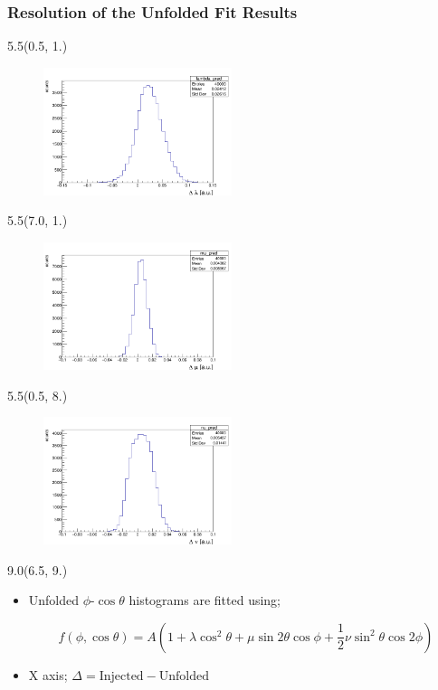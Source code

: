 \documentclass[12pt, xcolor={dvipsnames}, aspectratio = 169, sans, mathserif]{beamer}
\newenvironment{List}[2]
{\begin{textblock}{#1}#2
\begin{itemize}}
{\end{itemize}
\end{textblock}}
\newenvironment{Pic}[2]
{\begin{textblock}{#1}#2
\begin{figure}}
{\end{figure}
\end{textblock}}
\begin{document}
\begin{frame}
\frametitle{Resolution of the Unfolded Fit Results}

\begin{Pic}{5.5}{(0.5, 1.)}
  \includegraphics[width=5.5cm]{imgs/lambda_pred.png}
\end{Pic}

\begin{Pic}{5.5}{(7.0, 1.)}
  \includegraphics[width=5.5cm]{imgs/mu_pred.png}
\end{Pic}

\begin{Pic}{5.5}{(0.5, 8.)}
  \includegraphics[width=5.5cm]{imgs/nu_pred.png}
\end{Pic}

\begin{List}{9.0}{(6.5, 9.)}

  \item Unfolded $\phi$-$\cos\theta$ histograms are fitted using;

\begin{scriptsize}
\begin{equation}
\label{eq:1}
f(\phi, \cos\theta) = A(1  + \lambda \cos^{2}\theta + \mu \sin 2 \theta \cos \phi + \dfrac{1}{2}\nu \sin^{2}\theta \cos 2 \phi)
\end{equation}
\end{scriptsize}

  \item X axis;  $\Delta = \text{Injected} - \text{Unfolded}$

\end{List}
\end{frame}
\end{document}
